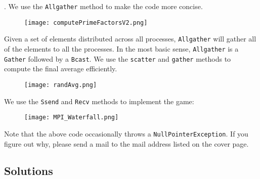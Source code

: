 \documentclass[main]{subfiles}
\begin{document}
\begin{ExerciseList}
    \Answer[ref={MPI}]. \quad
        \Question We use the \texttt{Allgather} method to make the code more concise.
            \begin{figure}[H]
                \centering
                \texttt{[image: computePrimeFactorsV2.png]}
            \end{figure}
            Given a set of elements distributed across all processes, \texttt{Allgather} will gather all of the elements to all the processes. In the most basic sense, \texttt{Allgather} is a \texttt{Gather} followed by a \texttt{Bcast}.
        \pagebreak
        \Question We use the \texttt{scatter} and \texttt{gather} methods to compute the final average efficiently.
        \begin{figure}[H]
            \centering
            \texttt{[image: randAvg.png]}
        \end{figure}
        \Question We use the \texttt{Ssend} and \texttt{Recv} methods to implement the game:
        \begin{figure}[H]
            \centering
            \texttt{[image: MPI\_Waterfall.png]}
        \end{figure}
        Note that the above code occasionally throws a \texttt{NullPointerException}. If you figure out why, please send a mail to the mail address listed on the cover page.
\end{ExerciseList}
\newpage
\subsection{Solutions}
\shipoutAnswer
\end{document}
